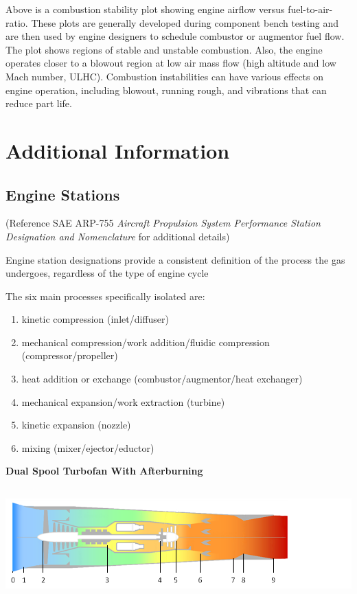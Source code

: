 \documentclass[
]{book}
\providecommand{\tightlist}{%
  \setlength{\itemsep}{0pt}\setlength{\parskip}{0pt}}
\begin{document}
Above is a combustion stability plot showing engine airflow versus
fuel-to-air-ratio. These plots are generally developed during component bench
testing and are then used by engine designers to schedule combustor or augmentor
fuel flow. The plot shows regions of stable and unstable combustion. Also, the
engine operates closer to a blowout region at low air mass flow (high altitude
and low Mach number, ULHC). Combustion instabilities can have various effects
on engine operation, including blowout, running rough, and vibrations that can
reduce part life.

\hypertarget{additional-information}{%
\section{Additional Information}\label{additional-information}}

\hypertarget{engine-stations}{%
\subsection{Engine Stations}\label{engine-stations}}

(Reference SAE ARP-755 \emph{Aircraft Propulsion System Performance Station Designation and Nomenclature}
for additional details)

Engine station designations provide a consistent definition of the process the
gas undergoes, regardless of the type of engine cycle

The six main processes specifically isolated are:

\begin{enumerate}
\def\labelenumi{\arabic{enumi}.}
\tightlist
\item
  kinetic compression (inlet/diffuser)
\item
  mechanical compression/work addition/fluidic compression (compressor/propeller)
\item
  heat addition or exchange (combustor/augmentor/heat exchanger)
\item
  mechanical expansion/work extraction (turbine)
\item
  kinetic expansion (nozzle)
\item
  mixing (mixer/ejector/eductor)
\end{enumerate}

\textbf{Dual Spool Turbofan With Afterburning}

\includegraphics[width=5.3875in,height=1.69792in]{media/17/image16.png}
\end{document}
